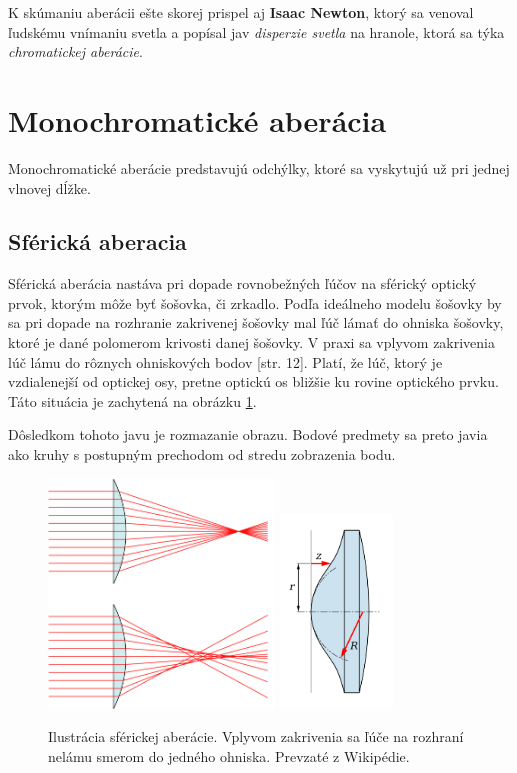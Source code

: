 K skúmaniu aberácii ešte skorej prispel aj \textbf{Isaac Newton}, ktorý sa venoval ľudskému vnímaniu svetla a
popísal jav \textit{disperzie svetla} na hranole, ktorá sa týka \textit{chromatickej aberácie}. \cite{elert}

\section{Monochromatické aberácia}
Monochromatické aberácie predstavujú odchýlky, ktoré sa vyskytujú už pri jednej vlnovej dĺžke.
\subsection{Sférická aberacia}
Sférická aberácia nastáva pri dopade rovnobežných ľúčov na sférický optický prvok, ktorým môže byť
šošovka, či zrkadlo. 
Podľa ideálneho modelu šošovky by sa pri dopade na rozhranie zakrivenej šošovky mal ľúč lámať do ohniska šošovky, ktoré
je dané polomerom krivosti danej šošovky. V praxi sa vplyvom zakrivenia lúč lámu do rôznych
ohniskových bodov \cite{elisa}[str. 12]. Platí, že lúč, ktorý je vzdialenejší od optickej osy, pretne optickú os bližšie
ku rovine optického prvku. Táto situácia je zachytená na obrázku \ref{saill}.

Dôsledkom tohoto javu je rozmazanie obrazu. Bodové predmety sa preto javia ako kruhy s postupným
prechodom od stredu zobrazenia bodu.

\begin{figure}[h]
\centering
\label{saill}
\includegraphics[width=6cm]{obrazky-figures/sphericalAberrationWikipedia.png}
\includegraphics[width=3cm]{obrazky-figures/asphericLen.png}
\caption{Ilustrácia sférickej aberácie. Vplyvom zakrivenia sa ľúče na rozhraní nelámu smerom
    do jedného ohniska. Prevzaté z Wikipédie\cite{sphericalAberrationWiki}.}
\end{figure}

